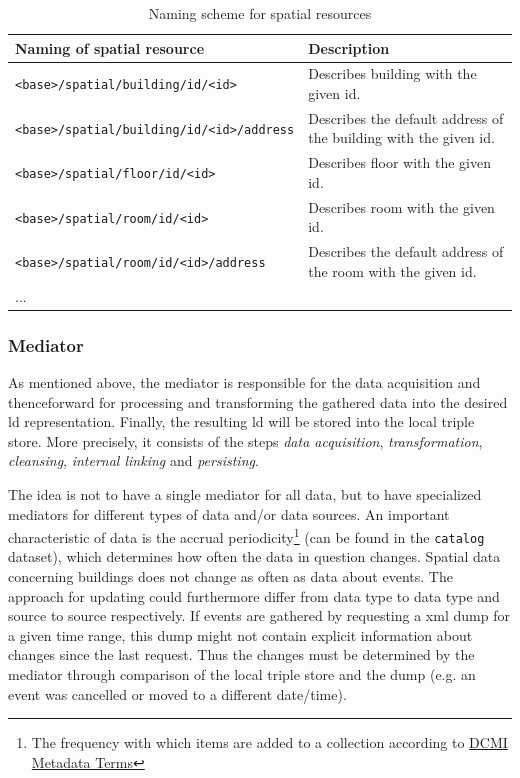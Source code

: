 \documentclass[draft,final]{vutinfth} %
\begin{document}
\begin{table}
  \centering
  \begin{tabular}{p{}p{}}
    \toprule
    Naming of spatial resource & Description \\
    \midrule
    \texttt{<base>/spatial/building/id/<id>} & Describes building with the given id.\\
    \texttt{<base>/spatial/building/id/<id>/address} & Describes the default address of the building with the given id.\\    
    \texttt{<base>/spatial/floor/id/<id>} & Describes floor with the given id.\\
    \texttt{<base>/spatial/room/id/<id>} & Describes room with the given id.\\
        \texttt{<base>/spatial/room/id/<id>/address} & Describes the default address of the room with the given id.\\ 
    ...\\
    \bottomrule
  \end{tabular}
  \caption{Naming scheme for spatial resources}
  \label{tab:architectural-prototype:resource-naming-scheme}
\end{table}

\subsubsection{Mediator}

As mentioned above, the mediator is responsible for the data acquisition and thenceforward for processing and transforming the gathered data into the desired \gls{ld} representation. Finally, the resulting \gls{ld} will be stored into the local triple store. More precisely, it consists of the steps \textit{data acquisition}, \textit{transformation}, \textit{cleansing}, \textit{internal linking} and \textit{persisting}. 

The idea is not to have a single mediator for all data, but to have specialized mediators for different types of data and/or data sources. An important characteristic of data is the accrual periodicity\footnote{The frequency with which items are added to a collection according to \href{http://dublincore.org/documents/2012/06/14/dcmi-terms/?v=terms\#accrualPeriodicity}{DCMI Metadata Terms}} (can be found in the \texttt{catalog} dataset), which determines how often the data in question changes. Spatial data concerning buildings does not change as often as data about events. The approach for updating could furthermore differ from data type to data type and source to source respectively. If events are gathered by requesting a \gls{xml} dump for a given time range, this dump might not contain explicit information about changes since the last request. Thus the changes must be determined by the mediator through comparison of the local triple store and the dump (e.g. an event was cancelled or moved to a different date/time). 
\end{document}

